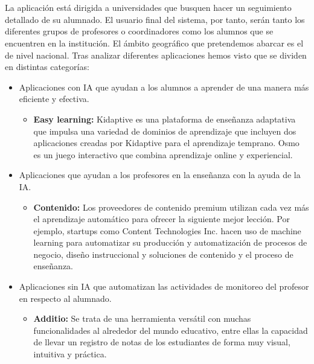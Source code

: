 \section{\mercado}

\paragraph{}
La aplicación está dirigida a universidades que busquen hacer un seguimiento detallado de su alumnado. El usuario final del sistema, por tanto, serán tanto los diferentes grupos de profesores o coordinadores como los alumnos que se encuentren en la institución. El ámbito geográfico que pretendemos abarcar es el de nivel nacional. Tras analizar diferentes aplicaciones hemos visto que se dividen en distintas categorías:

\begin{itemize}
\item Aplicaciones con IA que ayudan a los alumnos a aprender de una manera más eficiente y efectiva.
\begin{itemize}
\item \textbf{Easy learning:} Kidaptive es una plataforma de enseñanza adaptativa que impulsa una variedad de dominios de aprendizaje que incluyen dos aplicaciones creadas por Kidaptive para el aprendizaje temprano. Osmo es un juego interactivo que combina aprendizaje online y experiencial.
\end{itemize}
\item Aplicaciones que ayudan a los profesores en la enseñanza con la ayuda de la IA.
\begin{itemize}
\item \textbf{Contenido:} Los proveedores de contenido premium utilizan cada vez más el aprendizaje automático para ofrecer la siguiente mejor lección. Por ejemplo, startups como Content Technologies Inc. hacen uso de machine learning para automatizar su producción y automatización de procesos de negocio, diseño instruccional y soluciones de contenido y el proceso de enseñanza. 
\end{itemize}
\item Aplicaciones sin IA que automatizan las actividades de monitoreo del profesor en respecto al alumnado.\cite{appsEvaluacionEstudiantes}
\begin{itemize}
\item \textbf{Additio:} Se trata de una herramienta versátil con muchas funcionalidades al alrededor del mundo educativo, entre ellas la capacidad de llevar un registro de notas de los estudiantes de forma muy visual, intuitiva y práctica.

\end{itemize}
\end{itemize}
